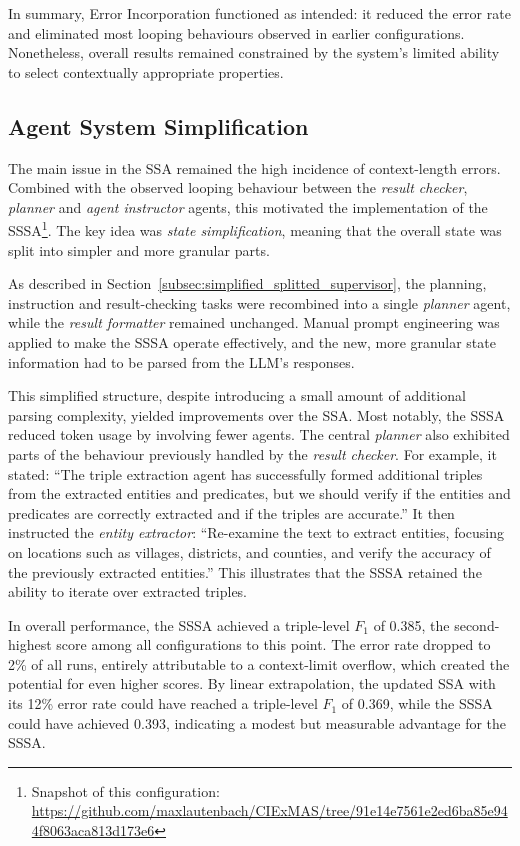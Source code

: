 \documentclass[a4paper,oneside,bibliography=totoc]{scrbook}
\begin{document}
In summary, Error Incorporation functioned as intended: it reduced the error rate and eliminated most looping behaviours observed in earlier configurations. Nonetheless, overall results remained constrained by the system’s limited ability to select contextually appropriate properties.

\subsection{Agent System Simplification}
\label{subsec:task_simplification_state_refinement}

The main issue in the \ac{SSA} remained the high incidence of context-length errors. Combined with the observed looping behaviour between the \textit{result checker}, \textit{planner} and \textit{agent instructor} agents, this motivated the implementation of the \ac{SSSA}\footnote{Snapshot of this configuration: \url{https://github.com/maxlautenbach/CIExMAS/tree/91e14e7561e2ed6ba85e944f8063aca813d173e6}}. The key idea was \textit{state simplification}, meaning that the overall state was split into simpler and more granular parts.

As described in Section~\ref{subsec:simplified_splitted_supervisor}, the planning, instruction and result-checking tasks were recombined into a single \textit{planner} agent, while the \textit{result formatter} remained unchanged. Manual prompt engineering was applied to make the \ac{SSSA} operate effectively, and the new, more granular state information had to be parsed from the \ac{LLM}’s responses.

This simplified structure, despite introducing a small amount of additional parsing complexity, yielded improvements over the \ac{SSA}. Most notably, the \ac{SSSA} reduced token usage by involving fewer agents. The central \textit{planner} also exhibited parts of the behaviour previously handled by the \textit{result checker}. For example, it stated: \enquote{The triple extraction agent has successfully formed additional triples from the extracted entities and predicates, but we should verify if the entities and predicates are correctly extracted and if the triples are accurate.} It then instructed the \textit{entity extractor}: \enquote{Re-examine the text to extract entities, focusing on locations such as villages, districts, and counties, and verify the accuracy of the previously extracted entities.} This illustrates that the \ac{SSSA} retained the ability to iterate over extracted triples.

In overall performance, the \ac{SSSA} achieved a triple-level $F_{1}$ of 0.385, the second-highest score among all configurations to this point. The error rate dropped to 2\% of all runs, entirely attributable to a context-limit overflow, which created the potential for even higher scores. By linear extrapolation, the updated \ac{SSA} with its 12\% error rate could have reached a triple-level $F_{1}$ of 0.369, while the \ac{SSSA} could have achieved 0.393, indicating a modest but measurable advantage for the \ac{SSSA}.
\end{document}
